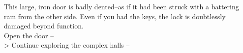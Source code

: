 This large, iron door is badly dented--as if it had been struck with a battering ram from the other side. Even if you had the keys, the lock is doubtlessly damaged beyond function.\\

 Open the door -- \\
> Continue exploring the complex halls -- 